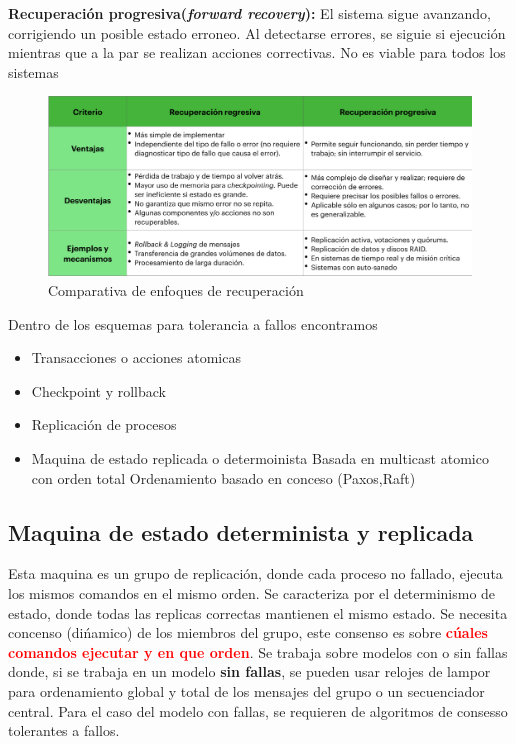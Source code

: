 \textbf{Recuperación progresiva(\textit{forward recovery}):} El sistema sigue avanzando, corrigiendo un posible estado erroneo. Al detectarse errores, se siguie si ejecución mientras que a la par se realizan acciones correctivas. No es viable para todos los sistemas

\begin{figure}[H]
    \centering
    \includegraphics[width=1\linewidth]{img/Comparacion_enfoques.png}
    \caption{Comparativa de enfoques de recuperación}\label{fig:1761609494042}
\end{figure}

Dentro de los esquemas para tolerancia a fallos encontramos 
\begin{itemize}
    \item Transacciones o acciones atomicas
    \item Checkpoint y rollback
    \item Replicación de procesos
    \item Maquina de estado replicada o determoinista
    \subitem Basada en multicast atomico con orden total
    \subitem Ordenamiento basado en conceso (Paxos,Raft)
\end{itemize}

\subsection{Maquina de estado determinista y replicada}
Esta maquina es un grupo de replicación, donde cada proceso no fallado, ejecuta los mismos comandos en el mismo orden. Se caracteriza por el determinismo de estado, donde todas las replicas correctas mantienen el mismo estado. Se necesita concenso (dińamico) de los miembros del grupo, este consenso es sobre \textcolor{red}{\textbf{cúales comandos ejecutar y en que orden}}. Se trabaja sobre modelos con o sin fallas donde, si se trabaja en un modelo \textbf{sin fallas}, se pueden usar relojes de lampor para ordenamiento global y total de los mensajes del grupo o un secuenciador central. Para el caso del modelo con fallas, se requieren de algoritmos de consesso tolerantes a fallos. 

